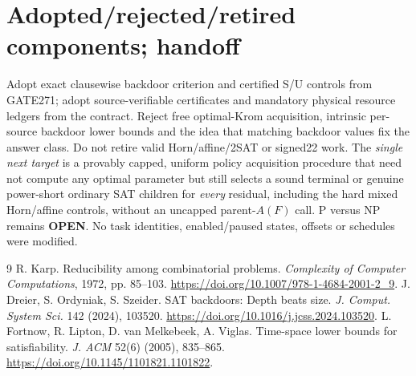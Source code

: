 \documentclass[11pt]{article}
\begin{document}
\section*{Adopted/rejected/retired components; handoff}
Adopt exact clausewise backdoor criterion and certified S/U controls from GATE271; adopt source-verifiable certificates and mandatory physical resource ledgers from the contract. Reject free optimal-Krom acquisition, intrinsic per-source backdoor lower bounds and the idea that matching backdoor values fix the answer class. Do not retire valid Horn/affine/2SAT or signed22 work. The \emph{single next target} is a provably capped, uniform policy acquisition procedure that need not compute any optimal parameter but still selects a sound terminal or genuine power-short ordinary SAT children for \emph{every} residual, including the hard mixed Horn/affine controls, without an uncapped parent-$A(F)$ call. P versus NP remains \textbf{OPEN}. No task identities, enabled/paused states, offsets or schedules were modified.

\begin{thebibliography}{9}
 R. Karp. Reducibility among combinatorial problems. \emph{Complexity of Computer Computations}, 1972, pp. 85--103. \url{https://doi.org/10.1007/978-1-4684-2001-2_9}.
 J. Dreier, S. Ordyniak, S. Szeider. SAT backdoors: Depth beats size. \emph{J. Comput. System Sci.} 142 (2024), 103520. \url{https://doi.org/10.1016/j.jcss.2024.103520}.
 L. Fortnow, R. Lipton, D. van Melkebeek, A. Viglas. Time-space lower bounds for satisfiability. \emph{J. ACM} 52(6) (2005), 835--865. \url{https://doi.org/10.1145/1101821.1101822}.
\end{thebibliography}
\end{document}
